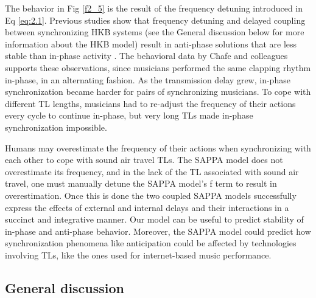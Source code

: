 \documentclass{report}
\begin{document}
The behavior in Fig \ref{f2_5} is the result of the frequency detuning introduced in Eq \eqref{eq:2.1}. Previous studies show that frequency detuning and delayed coupling between synchronizing HKB systems (see the General discussion below for more information about the HKB model) result in anti-phase solutions that are less stable than in-phase activity \cite{slowinski2016effects, avitabile2016beyond}. The behavioral data by Chafe and colleagues\cite{chafe2010effect} supports these observations, since musicians performed the same clapping rhythm in-phase, in an alternating fashion. As the transmission delay grew, in-phase synchronization became harder for pairs of synchronizing musicians. To cope with different TL lengths, musicians had to re-adjust the frequency of their actions every cycle to continue in-phase, but very long TLs made in-phase synchronization impossible.

Humans may overestimate the frequency of their actions when synchronizing with each other to cope with sound air travel TLs. The SAPPA model does not overestimate its frequency, and in the lack of the TL associated with sound air travel, one must manually detune the SAPPA model's f term to result in overestimation. Once this is done the two coupled SAPPA models successfully express the effects of external and internal delays and their interactions in a succinct and integrative manner. Our model can be useful to predict stability of in-phase and anti-phase behavior. Moreover, the SAPPA model could predict how synchronization phenomena like anticipation could be affected by technologies involving TLs, like the ones used for internet-based music performance.

\subsection{General discussion}
\end{document}
